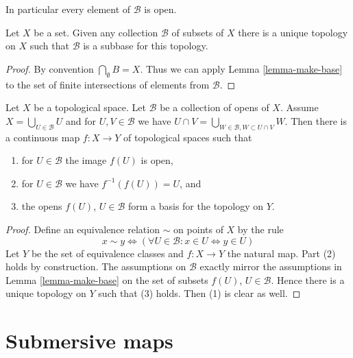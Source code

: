 \noindent
In particular every element of $\mathcal{B}$ is open.

\begin{lemma}
\label{lemma-subbase}
Let $X$ be a set. Given any collection $\mathcal{B}$ of subsets of $X$
there is a unique topology on $X$ such that $\mathcal{B}$ is a subbase
for this topology.
\end{lemma}

\begin{proof}
By convention $\bigcap_\emptyset B = X $. Thus we can apply Lemma
\ref{lemma-make-base} to the set of finite intersections of elements
from $\mathcal B$.
\end{proof}

\begin{lemma}
\label{lemma-create-map-from-subcollection}
Let $X$ be a topological space. Let $\mathcal{B}$ be a collection
of opens of $X$. Assume $X = \bigcup_{U \in \mathcal{B}} U$ and
for $U, V \in \mathcal{B}$ we have
$U \cap V = \bigcup_{W \in \mathcal{B}, W \subset U \cap V} W$.
Then there is a continuous map $f : X \to Y$ of topological spaces
such that
\begin{enumerate}
\item for $U \in \mathcal{B}$ the image $f(U)$ is open,
\item for $U \in \mathcal{B}$ we have $f^{-1}(f(U)) = U$, and
\item the opens $f(U)$, $U \in \mathcal{B}$
form a basis for the topology on $Y$.
\end{enumerate}
\end{lemma}

\begin{proof}
Define an equivalence relation $\sim$ on points of $X$
by the rule
$$
x \sim y \Leftrightarrow
(\forall U \in \mathcal{B} : x \in U \Leftrightarrow y \in U)
$$
Let $Y$ be the set of equivalence classes and $f : X \to Y$
the natural map. Part (2) holds by construction.
The assumptions on $\mathcal{B}$ exactly
mirror the assumptions in Lemma \ref{lemma-make-base}
on the set of subsets $f(U)$, $U \in \mathcal{B}$.
Hence there is a unique topology on $Y$ such that (3) holds.
Then (1) is clear as well.
\end{proof}






\section{Submersive maps}
\label{section-submersive}

